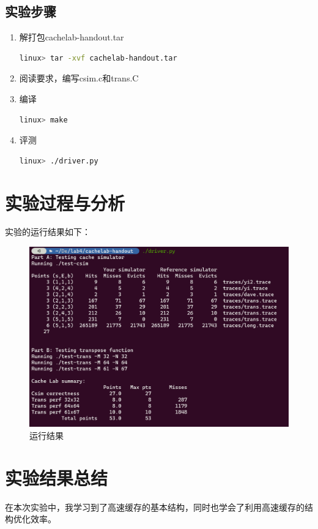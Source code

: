 \documentclass{article}
\begin{document}
\normalsize
\subsection{实验步骤}
\large
\begin{enumerate}[1)]
  \item 解打包cachelab-handout.tar
        \begin{lstlisting}[language=bash]
    linux> tar -xvf cachelab-handout.tar
    \end{lstlisting}
  \item 阅读要求，编写csim.c和trans.C
  \item 编译
        \begin{lstlisting}[language=bash]
    linux> make
    \end{lstlisting}
  \item 评测
        \begin{lstlisting}[language=bash]
    linux> ./driver.py
    \end{lstlisting}

\end{enumerate}
\normalsize
\section{实验过程与分析}
\large

实验的运行结果如下：
\begin{figure}[H]
  \centering
  \includegraphics[width=15cm]{1.png}
  \caption{运行结果}
\end{figure}


\normalsize
\section{实验结果总结}
\large
在本次实验中，我学习到了高速缓存的基本结构，同时也学会了利用高速缓存的结构优化效率。

\normalsize
\large




\normalsize
\end{document}

